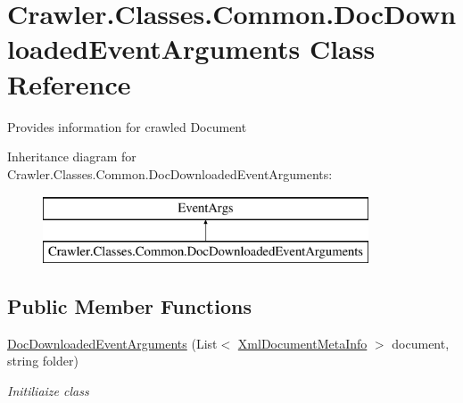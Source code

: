 \hypertarget{class_crawler_1_1_classes_1_1_common_1_1_doc_downloaded_event_arguments}{\section{Crawler.\-Classes.\-Common.\-Doc\-Downloaded\-Event\-Arguments Class Reference}
\label{class_crawler_1_1_classes_1_1_common_1_1_doc_downloaded_event_arguments}
}


Provides information for crawled Document  


Inheritance diagram for Crawler.\-Classes.\-Common.\-Doc\-Downloaded\-Event\-Arguments\-:\begin{figure}[H]
\begin{center}
\leavevmode
\includegraphics[height=2.000000cm]{class_crawler_1_1_classes_1_1_common_1_1_doc_downloaded_event_arguments}
\end{center}
\end{figure}
\subsection*{Public Member Functions}
\begin{DoxyCompactItemize}
\item 
\hyperlink{class_crawler_1_1_classes_1_1_common_1_1_doc_downloaded_event_arguments_af8d8b7db6217332bb179c5fb36f9febb}{Doc\-Downloaded\-Event\-Arguments} (List$<$ \hyperlink{class_metainfo_e_u_cases_1_1_xml_document_meta_info}{Xml\-Document\-Meta\-Info} $>$ document, string folder)
\begin{DoxyCompactList}\small\item\em Initiliaize class \end{DoxyCompactList}\end{DoxyCompactItemize}
